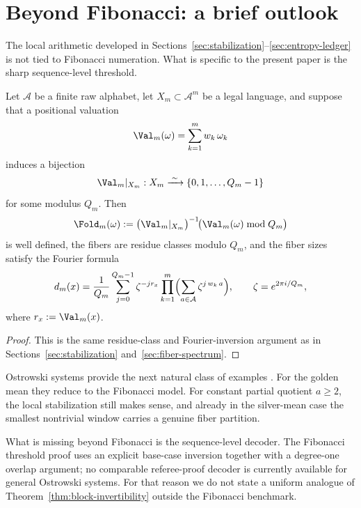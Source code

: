 \section{Beyond Fibonacci: a brief outlook}\label{sec:generalization}

The local arithmetic developed in Sections~\ref{sec:stabilization}--\ref{sec:entropy-ledger} is not tied to Fibonacci numeration. What is specific to the present paper is the sharp sequence-level threshold.

\begin{proposition}\label{prop:gen-fiber}
Let $\mathcal A$ be a finite raw alphabet, let $X_m\subset \mathcal A^m$ be a legal language, and suppose that a positional valuation
\[
\Val_m(\omega)=\sum_{k=1}^m w_k\,\omega_k
\]
induces a bijection
\[
\Val_m|_{X_m}:X_m\xrightarrow{\;\sim\;}\{0,1,\ldots,Q_m-1\}
\]
for some modulus $Q_m$. Then
\[
\Fold_m(\omega):=\bigl(\Val_m|_{X_m}\bigr)^{-1}\!\bigl(\Val_m(\omega)\bmod Q_m\bigr)
\]
is well defined, the fibers are residue classes modulo $Q_m$, and the fiber sizes satisfy the Fourier formula
\begin{equation}\label{eq:gen-dft}
d_m(x)=\frac{1}{Q_m}\sum_{j=0}^{Q_m-1}\zeta^{-jr_x}
\prod_{k=1}^m\Bigl(\sum_{a\in\mathcal A}\zeta^{j\,w_k\,a}\Bigr),
\qquad
\zeta=e^{2\pi i/Q_m},
\end{equation}
where $r_x:=\Val_m(x)$.
\end{proposition}

\begin{proof}
This is the same residue-class and Fourier-inversion argument as in Sections~\ref{sec:stabilization} and~\ref{sec:fiber-spectrum}.
\end{proof}

Ostrowski systems provide the next natural class of examples \cite{Ostrowski1922,Berthe2001Ostrowski,AlloucheShallit2003}. For the golden mean they reduce to the Fibonacci model. For constant partial quotient $a\ge2$, the local stabilization still makes sense, and already in the silver-mean case the smallest nontrivial window carries a genuine fiber partition.

What is missing beyond Fibonacci is the sequence-level decoder. The Fibonacci threshold proof uses an explicit base-case inversion together with a degree-one overlap argument; no comparable referee-proof decoder is currently available for general Ostrowski systems. For that reason we do not state a uniform analogue of Theorem~\ref{thm:block-invertibility} outside the Fibonacci benchmark.
